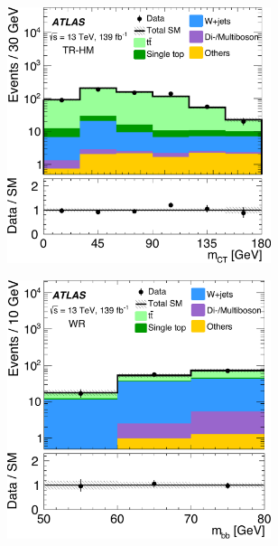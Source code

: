 \begin{figure}
\begin{subfigure}[b]{0.5\linewidth}
		\centering\includegraphics[width=0.85\textwidth]{fig_02c_yellow}
	\end{subfigure}\hfill
	\begin{subfigure}[b]{0.5\linewidth}
		\centering\includegraphics[width=0.85\textwidth]{fig_02d_yellow}
	\end{subfigure}\hfill
	\par\bigskip
	\begin{subfigure}[b]{0.5\linewidth}

\end{subfigure}
\end{figure}
